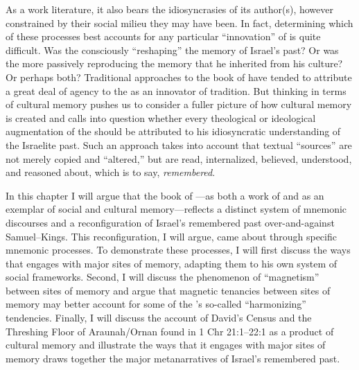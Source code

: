 As a work literature, it also bears the idiosyncrasies of its author(s), however constrained by their social milieu they may have been. In fact, determining which of these processes best accounts for any particular ``innovation'' of \chronicles is quite difficult. Was the \chronicler consciously ``reshaping'' the memory of Israel's past? Or was the \chronicler more passively reproducing the memory that he inherited from his culture? Or perhaps both? Traditional approaches to the book of \chronicles have tended to attribute a great deal of agency to the \chronicler as an innovator of tradition. But thinking in terms of cultural memory pushes us to consider a fuller picture of how cultural memory is created and calls into question whether every theological or ideological augmentation of the \chronicler should be attributed to his idiosyncratic understanding of the Israelite past. Such an approach takes into account that textual ``sources'' are not merely copied and ``altered,'' but are read, internalized, believed, understood, and reasoned about, which is to say, \emph{remembered}.

In this chapter I will argue that the book of \chronicles---as both a work of \rwb and as an exemplar of social and cultural memory---reflects a distinct system of mnemonic discourses and a reconfiguration of Israel's remembered past over-and-against Samuel--Kings. This reconfiguration, I will argue, came about through specific mnemonic processes.  To demonstrate these processes, I will first discuss the ways that \chronicles engages with major sites of memory, adapting them to his own system of social frameworks. Second, I will discuss the phenomenon of ``magnetism'' between sites of memory and argue that magnetic tenancies between sites of memory may better account for some of the \chronicler's so-called ``harmonizing'' tendencies. Finally, I will discuss the account of David's Census and the Threshing Floor of Araunah/Ornan found in 1 Chr 21:1--22:1 as a product of cultural memory and illustrate the ways that it engages with major sites of memory draws together the major metanarratives of Israel's remembered past.
